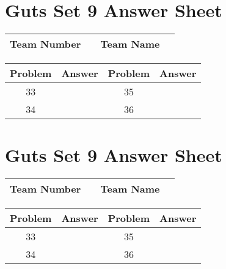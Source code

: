 \documentclass[14pt]{article}
\begin{document}
\vspace{30px}

\section*{Guts Set 9 Answer Sheet}

\begin{center}
\begin{tabular}{|r|r|r|r|}
\hline
	Team Number & \hspace{10em} &
	Team Name & \hspace{15em} \\ \hline
\end{tabular}
\end{center}
\begin{tabularx}{\textwidth}{|c|l|c|X|}\hline
	Problem & Answer & Problem & Answer \\\hline
	33 & \hspace{15em} & 35 & \\\hline
	34 & & 36 & \\\hline
\end{tabularx}

\vspace{30px}

\section*{Guts Set 9 Answer Sheet}

\begin{center}
\begin{tabular}{|r|r|r|r|}
\hline
	Team Number & \hspace{10em} &
	Team Name & \hspace{15em} \\ \hline
\end{tabular}
\end{center}
\begin{tabularx}{\textwidth}{|c|l|c|X|}\hline
	Problem & Answer & Problem & Answer \\\hline
	33 & \hspace{15em} & 35 & \\\hline
	34 & & 36 & \\\hline
\end{tabularx}
\end{document}
